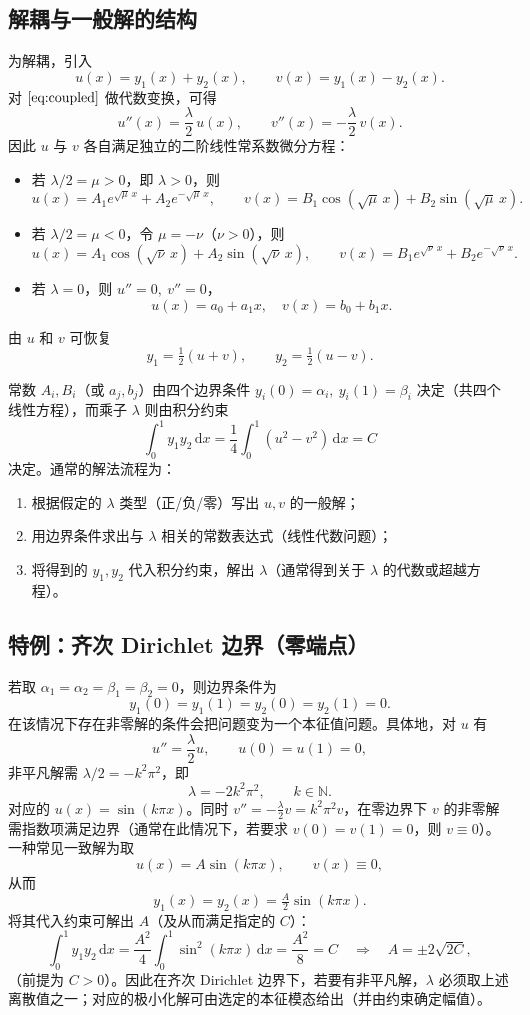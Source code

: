 \documentclass[11pt]{article}
\begin{document}
\subsection*{解耦与一般解的结构}
为解耦，引入
\[
u(x)=y_1(x)+y_2(x),\qquad v(x)=y_1(x)-y_2(x).
\]
对 \(\eqref{eq:coupled}\) 做代数变换，可得
\[
u''(x) = \frac{\lambda}{2}\,u(x),\qquad v''(x) = -\frac{\lambda}{2}\,v(x).
\]
因此 \(u\) 与 \(v\) 各自满足独立的二阶线性常系数微分方程：

\begin{itemize}
  \item 若 \(\lambda/2 = \mu > 0\)，即 \(\lambda>0\)，则
  \[
  u(x)=A_1 e^{\sqrt{\mu}\,x}+A_2 e^{-\sqrt{\mu}\,x},\qquad
  v(x)=B_1\cos(\sqrt{\mu}\,x)+B_2\sin(\sqrt{\mu}\,x).
  \]
  \item 若 \(\lambda/2 = \mu < 0\)，令 \(\mu=-\nu\)（\(\nu>0\)），则
  \[
  u(x)=A_1\cos(\sqrt{\nu}\,x)+A_2\sin(\sqrt{\nu}\,x),\qquad
  v(x)=B_1 e^{\sqrt{\nu}\,x}+B_2 e^{-\sqrt{\nu}\,x}.
  \]
  \item 若 \(\lambda=0\)，则 \(u''=0,\ v''=0\)，
  \[
  u(x)=a_0+a_1 x,\quad v(x)=b_0+b_1 x.
  \]
\end{itemize}

由 \(u\) 和 \(v\) 可恢复
\[
y_1=\tfrac{1}{2}(u+v),\qquad y_2=\tfrac{1}{2}(u-v).
\]

常数 \(A_i,B_i\)（或 \(a_j,b_j\)）由四个边界条件 \(y_i(0)=\alpha_i,\ y_i(1)=\beta_i\) 决定（共四个线性方程），而乘子 \(\lambda\) 则由积分约束
\[
\int_0^1 y_1 y_2\,\mathrm{d}x = \frac{1}{4}\int_0^1 (u^2 - v^2)\,\mathrm{d}x = C
\]
决定。通常的解法流程为：
\begin{enumerate}
  \item 根据假定的 \(\lambda\) 类型（正/负/零）写出 \(u,v\) 的一般解；
  \item 用边界条件求出与 \(\lambda\) 相关的常数表达式（线性代数问题）；
  \item 将得到的 \(y_1,y_2\) 代入积分约束，解出 \(\lambda\)（通常得到关于 \(\lambda\) 的代数或超越方程）。
\end{enumerate}

\subsection*{特例：齐次 Dirichlet 边界（零端点）}
若取 \(\alpha_1=\alpha_2=\beta_1=\beta_2=0\)，则边界条件为
\[
y_1(0)=y_1(1)=y_2(0)=y_2(1)=0.
\]
在该情况下存在非零解的条件会把问题变为一个本征值问题。具体地，对 $u$ 有
\[
u''=\frac{\lambda}{2}u,\qquad u(0)=u(1)=0,
\]
非平凡解需 $\lambda/2=-k^2\pi^2$，即
\[
\lambda = -2 k^2\pi^2,\qquad k\in\mathbb{N}.
\]
对应的 $u(x)=\sin(k\pi x)$。同时 $v'' = -\frac{\lambda}{2} v = k^2\pi^2 v$，在零边界下 $v$ 的非零解需指数项满足边界（通常在此情况下，若要求 $v(0)=v(1)=0$，则 $v\equiv 0$）。一种常见一致解为取
\[
u(x)=A\sin(k\pi x),\qquad v(x)\equiv 0,
\]
从而
\[
y_1(x)=y_2(x)=\tfrac{A}{2}\sin(k\pi x).
\]
将其代入约束可解出 \(A\)（及从而满足指定的 \(C\)）：
\[
\int_0^1 y_1 y_2\,\mathrm{d}x = \frac{A^2}{4}\int_0^1 \sin^2(k\pi x)\,\mathrm{d}x = \frac{A^2}{8} = C
\quad\Longrightarrow\quad A=\pm 2\sqrt{2C},
\]
（前提为 \(C>0\)）。因此在齐次 Dirichlet 边界下，若要有非平凡解，\(\lambda\) 必须取上述离散值之一；对应的极小化解可由选定的本征模态给出（并由约束确定幅值）。
\end{document}
